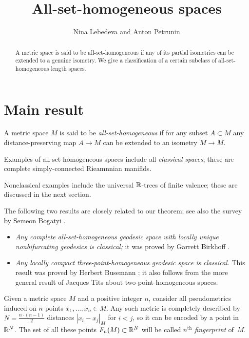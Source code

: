 \documentclass[a4paper,10pt]{article}
\def\thetitle{All-set-homogeneous spaces}
\def\theauthors{Nina Lebedeva and Anton Petrunin}
\begin{document}


\title{\thetitle}
\author{\theauthors}
\date{}
\maketitle

\begin{abstract}
A metric space is said to be all-set-homogeneous if any of its partial isometries can be extended to a genuine isometry.
We give a classification of a certain subclass of all-set-homogeneous length spaces.
\end{abstract}

\section{Main result}

A metric space $M$ is said to be \emph{all-set-homogeneous} if for any subset $A\subset M$ any distance-preserving map $A\to M$ can be extended to an isometry $M\to M$.

Examples of all-set-homogeneous spaces include all \emph{classical spaces};
these are complete simply-connected Rieamnnian maniflds.

Nonclassical examples include the universal $\mathbb{R}$-trees of finite valence;
these are discussed in the next section.

The following two results are closely related to our theorem; see also the survey by Semeon Bogatyi \cite{bogaty}.
\begin{itemize}
\item \emph{Any complete all-set-homogeneous geodesic space with locally unique nonbifurcating geodesics is classical;} it was proved by Garrett Birkhoff \cite{birkhoff}.
\item \emph{Any locally compact three-point-homogeneous geodesic space is classical.}
 This result was proved by Herbert Busemann \cite{busemann}; it also follows from the more general result of Jacques Tits \cite{tits} about two-point-homogeneous spaces.
\end{itemize}


Given a metric space $M$ and a positive integer $n$, consider all pseudometrics induced on $n$ points $x_1,\dots, x_n\in M$.
Any such metric is completely described by $N=\tfrac{n\cdot (n-1)}2$ distances $|x_i-x_j|_M$ for $i<j$, so it can be encoded by a point in $\mathbb{R}^N$.
The set of all these points $F_n(M)\subset \mathbb{R}^N$ will be called \emph{$n^\text{th}$ fingerprint} of~$M$.
\end{document}
